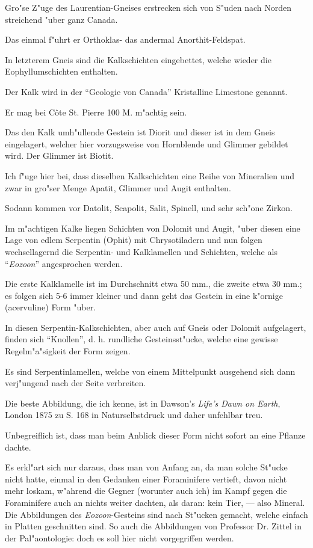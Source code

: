 \documentclass[a4paper, 11pt, oneside, german]{article}
\begin{document}
Gro"se Z"uge des Laurentian-Gneises erstrecken sich von S"uden nach Norden streichend "uber ganz Canada.

Das einmal f"uhrt er Orthoklas- das andermal Anorthit-Feldspat.

In letzterem Gneis sind die Kalkschichten eingebettet, welche wieder die Eophyllumschichten enthalten.

Der Kalk wird in der "`Geologie von Canada"' Kristalline Limestone genannt.

Er mag bei Côte St. Pierre 100 M. m"achtig sein.

Das den Kalk umh"ullende Gestein ist Diorit und dieser ist in dem Gneis eingelagert, welcher hier vorzugsweise von Hornblende und Glimmer gebildet wird. Der Glimmer ist Biotit.

Ich f"uge hier bei, dass dieselben Kalkschichten eine Reihe von Mineralien und zwar in gro"ser Menge Apatit, Glimmer und Augit enthalten.

Sodann kommen vor Datolit, Scapolit, Salit, Spinell, und sehr sch"one Zirkon.

Im m"achtigen Kalke liegen Schichten von Dolomit und Augit, "uber diesen eine Lage von edlem Serpentin (Ophit) mit Chrysotiladern und nun folgen wechsellagernd die Serpentin- und Kalklamellen und Schichten, welche als "`\emph{Eozoon}"' angesprochen werden.

Die erste Kalklamelle ist im Durchschnitt etwa 50 mm., die zweite etwa 30 mm.; es folgen sich 5-6 immer kleiner und dann geht das Gestein in eine k"ornige (acervuline) Form "uber.

In diesen Serpentin-Kalkschichten, aber auch auf Gneis oder Dolomit aufgelagert, finden sich "`Knollen"', d. h. rundliche Gesteinsst"ucke, welche eine gewisse Regelm"a"sigkeit der Form zeigen.

Es sind Serpentinlamellen, welche von einem Mittelpunkt ausgehend sich dann verj"ungend nach der Seite verbreiten.

Die beste Abbildung, die ich kenne, ist in Dawson's \emph{Life's Dawn on Earth}, London 1875 zu S. 168 in Naturselbstdruck und daher unfehlbar treu.

Unbegreiflich ist, dass man beim Anblick dieser Form nicht sofort an eine Pflanze dachte.

Es erkl"art sich nur daraus, dass man von Anfang an, da man solche St"ucke nicht hatte, einmal in den Gedanken einer Foraminifere vertieft, davon nicht mehr loskam, w"ahrend die Gegner (worunter auch ich) im Kampf gegen die Foraminifere auch an nichts weiter dachten, als daran: kein Tier, --- also Mineral. Die Abbildungen des \emph{Eozoon}-Gesteins sind nach St"ucken gemacht, welche einfach in Platten geschnitten sind. So auch die Abbildungen von Professor Dr. Zittel in der Pal"aontologie: doch es soll hier nicht vorgegriffen werden.
\end{document}
